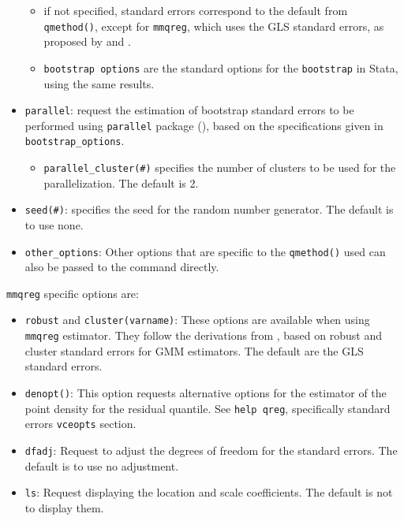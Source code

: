 \documentclass[bib]{statapress}
\providecommand{\tightlist}{%
  \setlength{\itemsep}{0pt}\setlength{\parskip}{0pt}}\usepackage{longtable,booktabs,array}
\begin{document}
\begin{itemize}
  \begin{itemize}
  \tightlist
  \item
    if not specified, standard errors correspond to the default from
    \texttt{qmethod()}, except for \texttt{mmqreg}, which uses the GLS
    standard errors, as proposed by \citet{mss2019} and
    \citet{riosavila2024}.
  \item
    \texttt{bootstrap\ options} are the standard options for the
    \texttt{bootstrap} in Stata, using the same results.
  \end{itemize}
\item
  \texttt{parallel}: request the estimation of bootstrap standard errors
  to be performed using \texttt{parallel} package (\citet{vegayon2019}),
  based on the specifications given in \texttt{bootstrap\_options}.

  \begin{itemize}
  \tightlist
  \item
    \texttt{parallel\_cluster(\#)} specifies the number of clusters to
    be used for the parallelization. The default is 2.
  \end{itemize}
\item
  \texttt{seed(\#)}: specifies the seed for the random number generator.
  The default is to use none.
\item
  \texttt{other\_options}: Other options that are specific to the
  \texttt{qmethod()} used can also be passed to the command directly.
\end{itemize}

\texttt{mmqreg} specific options are:

\begin{itemize}
\tightlist
\item
  \texttt{robust} and \texttt{cluster(varname)}: These options are
  available when using \texttt{mmqreg} estimator. They follow the
  derivations from \citet{riosavila2024}, based on robust and cluster
  standard errors for GMM estimators. The default are the GLS standard
  errors.
\item
  \texttt{denopt()}: This option requests alternative options for the
  estimator of the point density for the residual quantile. See
  \texttt{help\ qreg}, specifically standard errors \texttt{vceopts}
  section.
\item
  \texttt{dfadj}: Request to adjust the degrees of freedom for the
  standard errors. The default is to use no adjustment.
\item
  \texttt{ls}: Request displaying the location and scale coefficients.
  The default is not to display them.
\end{itemize}
\end{document}
